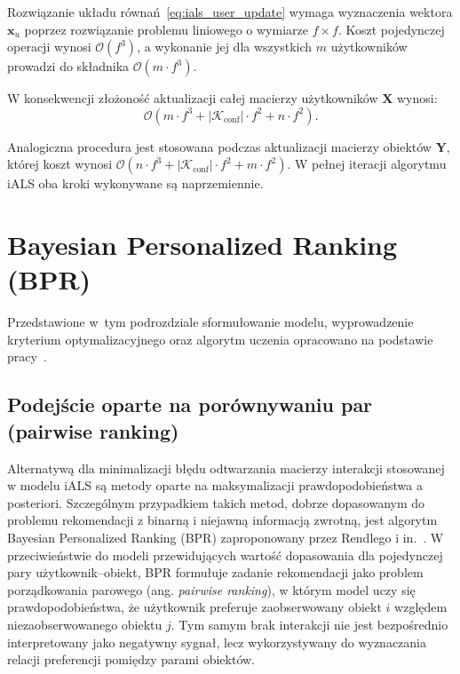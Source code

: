 Rozwiązanie układu równań~\eqref{eq:ials_user_update} wymaga wyznaczenia wektora $\mathbf{x}_u$ poprzez rozwiązanie problemu liniowego o wymiarze $f \times f$. Koszt pojedynczej operacji wynosi $\mathcal{O}(f^3)$, a wykonanie jej dla wszystkich $m$ użytkowników prowadzi do składnika $\mathcal{O}(m\cdot f^3)$.

W konsekwencji złożoność aktualizacji całej macierzy użytkowników $\mathbf{X}$ wynosi:
\begin{equation}
    \mathcal{O}\left(
    m\cdot f^3
    +
    |\mathcal{K}_{\text{conf}}|\cdot f^2
    +
    n\cdot f^2
    \right).
\end{equation}

Analogiczna procedura jest stosowana podczas aktualizacji macierzy obiektów $\mathbf{Y}$, której koszt wynosi $\mathcal{O}(n\cdot f^3 + |\mathcal{K}_{\text{conf}}|\cdot f^2 + m\cdot f^2)$. W pełnej iteracji algorytmu iALS oba kroki wykonywane są naprzemiennie.

\section{Bayesian Personalized Ranking (BPR)}

Przedstawione w~tym podrozdziale sformułowanie modelu, wyprowadzenie kryterium optymalizacyjnego oraz algorytm uczenia opracowano na podstawie pracy~\cite{rendle2009bpr}.

\subsection{Podejście oparte na porównywaniu par (pairwise ranking)}

Alternatywą dla minimalizacji błędu odtwarzania macierzy interakcji stosowanej w modelu iALS są metody oparte na maksymalizacji prawdopodobieństwa a posteriori. Szczególnym przypadkiem takich metod, dobrze dopasowanym do problemu rekomendacji z binarną i niejawną informacją zwrotną, jest algorytm Bayesian Personalized Ranking (BPR) zaproponowany przez Rendlego i in.~\cite{rendle2009bpr}. W przeciwieństwie do modeli przewidujących wartość dopasowania dla pojedynczej pary użytkownik--obiekt, BPR formułuje zadanie rekomendacji jako problem porządkowania parowego (ang. \textit{pairwise ranking}), w którym model uczy się prawdopodobieństwa, że użytkownik preferuje zaobserwowany obiekt $i$ względem niezaobserwowanego obiektu $j$. Tym samym brak interakcji nie jest bezpośrednio interpretowany jako negatywny sygnał, lecz wykorzystywany do wyznaczania relacji preferencji pomiędzy parami obiektów.

